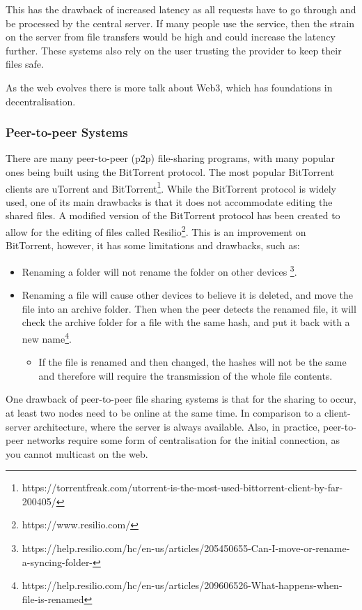 \documentclass[12pt]{article}
\begin{document}
This has the drawback of increased latency as all requests have to go through and be processed by the central server. If many people use the service, then the strain on the server from file transfers would be high and could increase the latency further. These systems also rely on the user trusting the provider to keep their files safe. \par

As the web evolves there is more talk about Web3\cite{WhatIsWeb3}, which has foundations in decentralisation.
\subsubsection{Peer-to-peer Systems}
There are many peer-to-peer (p2p) file-sharing programs, with many popular ones being built using the BitTorrent protocol. The most popular BitTorrent clients are uTorrent and BitTorrent\footnote{https://torrentfreak.com/utorrent-is-the-most-used-bittorrent-client-by-far-200405/}. While the BitTorrent protocol is widely used, one of its main drawbacks is that it does not accommodate editing the shared files. A modified version of the  BitTorrent protocol has been created to allow for the editing of files called Resilio\footnote{https://www.resilio.com/}. This is an improvement on BitTorrent, however, it has some limitations and drawbacks, such as:
\begin{itemize}
    \item Renaming a folder will not rename the folder on other devices \footnote{https://help.resilio.com/hc/en-us/articles/205450655-Can-I-move-or-rename-a-syncing-folder-}.
    \item Renaming a file will cause other devices to believe it is deleted, and move the file into an archive folder. Then when the peer detects the renamed file, it will check the archive folder for a file with the same hash, and put it back with a new name\footnote{https://help.resilio.com/hc/en-us/articles/209606526-What-happens-when-file-is-renamed}.
          \begin{itemize}
              \item If the file is renamed and then changed, the hashes will not be the same and therefore will require the transmission of the whole file contents.
          \end{itemize}
\end{itemize}  \par
One drawback of peer-to-peer file sharing systems is that for the sharing to occur, at least two nodes need to be online at the same time. In comparison to a client-server architecture, where the server is always available. Also, in practice, peer-to-peer networks require some form of centralisation for the initial connection, as you cannot multicast on the web.
\end{document}
